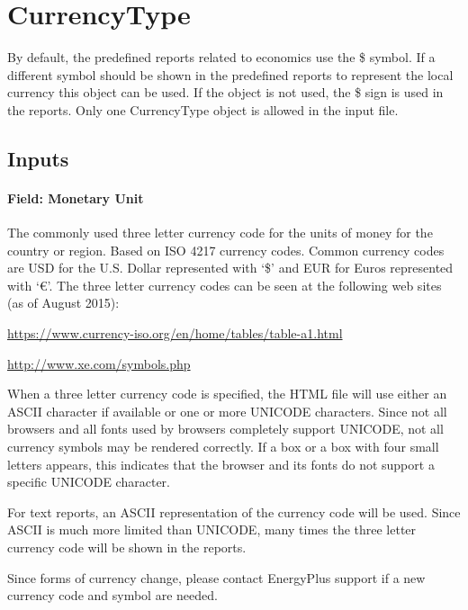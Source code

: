 \section{CurrencyType}\label{currencytype}
By default, the predefined reports related to economics use the \$ symbol. If a different symbol should be shown in the predefined reports to represent the local currency this object can be used. If the object is not used, the \$ sign is used in the reports. Only one CurrencyType object is allowed in the input file.

\subsection{Inputs}\label{inputs-061}

\paragraph{Field: Monetary Unit}\label{field-monetary-unit}

The commonly used three letter currency code for the units of money for the country or region. Based on ISO 4217 currency codes. Common currency codes are USD for the U.S. Dollar represented with `\$' and EUR for Euros represented with `€'. The three letter currency codes can be seen at the following web sites (as of August 2015):

\url{https://www.currency-iso.org/en/home/tables/table-a1.html}

\url{http://www.xe.com/symbols.php}

When a three letter currency code is specified, the HTML file will use either an ASCII character if available or one or more UNICODE characters. Since not all browsers and all fonts used by browsers completely support UNICODE, not all currency symbols may be rendered correctly. If a box or a box with four small letters appears, this indicates that the browser and its fonts do not support a specific UNICODE character.

For text reports, an ASCII representation of the currency code will be used. Since ASCII is much more limited than UNICODE, many times the three letter currency code will be shown in the reports.

Since forms of currency change, please contact EnergyPlus support if a new currency code and symbol are needed.

